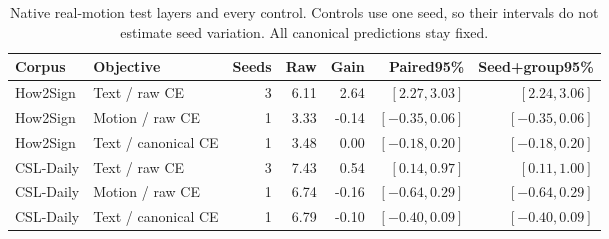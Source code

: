 \begin{table}[t]
\centering\small
\caption{Native real-motion test layers and every control. Controls use one seed, so their intervals do not estimate seed variation. All canonical predictions stay fixed.}
\label{tab:realcontrols}
\begin{tabular}{llrrrrr}\toprule
Corpus&Objective&Seeds&Raw&Gain&Paired95\%&Seed+group95\%\\\midrule
How2Sign&Text / raw CE&3&6.11&2.64&$[2.27,3.03]$&$[2.24,3.06]$\\
How2Sign&Motion / raw CE&1&3.33&-0.14&$[-0.35,0.06]$&$[-0.35,0.06]$\\
How2Sign&Text / canonical CE&1&3.48&0.00&$[-0.18,0.20]$&$[-0.18,0.20]$\\
CSL-Daily&Text / raw CE&3&7.43&0.54&$[0.14,0.97]$&$[0.11,1.00]$\\
CSL-Daily&Motion / raw CE&1&6.74&-0.16&$[-0.64,0.29]$&$[-0.64,0.29]$\\
CSL-Daily&Text / canonical CE&1&6.79&-0.10&$[-0.40,0.09]$&$[-0.40,0.09]$\\
\bottomrule\end{tabular}\end{table}
